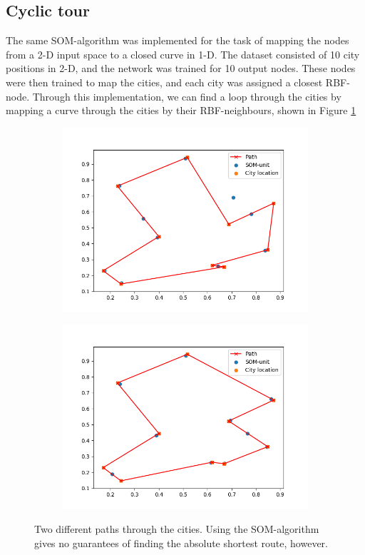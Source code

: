 \documentclass[a4paper]{article}
\begin{document}
\subsection{Cyclic tour}
The same SOM-algorithm was implemented for the task of mapping the nodes from a 2-D input space to a closed curve in 1-D. The dataset consisted of 10 city positions in 2-D, and the network was trained for 10 output nodes. These nodes were then trained to map the cities, and each city was assigned a closest RBF-node. Through this implementation, we can find a loop through the cities by mapping a curve through the cities by their RBF-neighbours, shown in Figure \ref{fig:cities}

\begin{figure}[ht]
   \begin{subfigure}[b]{0.5\textwidth}
   \centering
   \includegraphics[width=\linewidth]{figures/cities1.png}
   \end{subfigure}
  \begin{subfigure}[b]{0.5\textwidth}
   \centering
   \includegraphics[width=\linewidth]{figures/cities2.png}
   \end{subfigure}
    \caption{Two different paths through the cities. Using the SOM-algorithm gives no guarantees of finding the absolute shortest route, however.}
   \label{fig:cities}
\end{figure}
\end{document}
